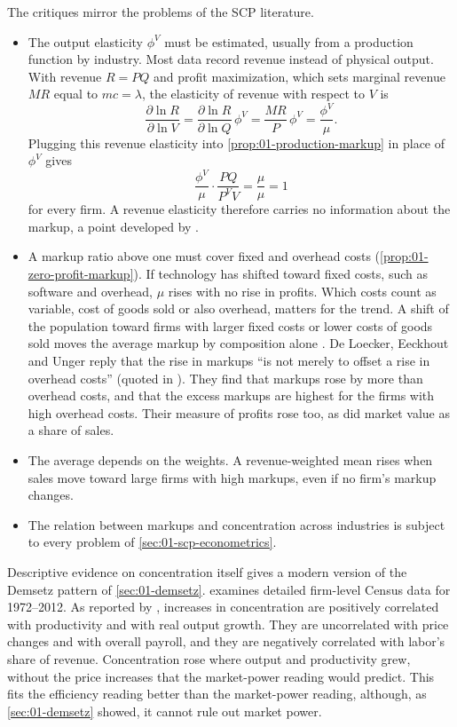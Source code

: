 The critiques mirror the problems of the SCP literature.
\begin{itemize}
\item The output elasticity $\phi^V$ must be estimated, usually from a production function by industry.
Most data record revenue instead of physical output. With revenue $R = PQ$ and profit maximization,
which sets marginal revenue $MR$ equal to $mc = \lambda$, the elasticity of revenue with respect to $V$ is
\[
\frac{\partial \ln R}{\partial \ln V} = \frac{\partial \ln R}{\partial \ln Q} \, \phi^V
 = \frac{MR}{P} \, \phi^V = \frac{\phi^V}{\mu}.
\]
Plugging this revenue elasticity into \cref{prop:01-production-markup} in place of $\phi^V$ gives
\[
\frac{\phi^V}{\mu} \cdot \frac{PQ}{P^V V} = \frac{\mu}{\mu} = 1
\]
for every firm. A revenue elasticity therefore carries no information about the markup, a point
developed by \citet{BondEtAl2021}.
\item A markup ratio above one must cover fixed and overhead costs (\cref{prop:01-zero-profit-markup}).
If technology has shifted toward fixed costs, such as software and overhead, $\mu$ rises with no rise in
profits. Which costs count as variable, cost of goods sold or also overhead, matters for the trend. A shift
of the population toward firms with larger fixed costs or lower costs of goods sold moves the average markup
by composition alone \citep[p.~258]{AskerNocke2021}. De Loecker, Eeckhout and Unger reply that the rise in
markups ``is not merely to offset a rise in overhead costs'' (quoted in \citealp[p.~258, n.~205]{AskerNocke2021}).
They find that markups rose by more than overhead costs, and that the excess markups are highest for the firms
with high overhead costs. Their measure of profits rose too, as did market value as a share of sales.
\item The average depends on the weights. A revenue-weighted mean rises when sales move toward large firms
with high markups, even if no firm's markup changes.
\item The relation between markups and concentration across industries is subject to every problem of
\cref{sec:01-scp-econometrics}.
\end{itemize}
Descriptive evidence on concentration itself gives a modern version of the Demsetz pattern of
\cref{sec:01-demsetz}. \citet{Ganapati2020} examines detailed firm-level Census data for 1972--2012. As reported
by \citet[p.~259]{AskerNocke2021}, increases in concentration are positively correlated with productivity and with real output growth. They are
uncorrelated with price changes and with overall payroll, and they are negatively correlated with labor's share
of revenue. Concentration rose where output and productivity grew, without the price increases that the
market-power reading would predict. This fits the efficiency reading better than the market-power reading,
although, as \cref{sec:01-demsetz} showed, it cannot rule out market power.

